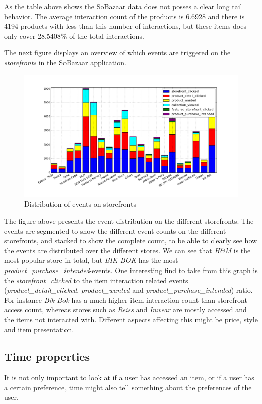     As the table above shows the SoBazaar data does not posses a clear long tail behavior.
    The average interaction count of the products is 6.6928 and there is 4194 products with less than this number of interactions, but these items does only cover 28.5408\% of the total interactions.

    The next figure displays an overview of which events are triggered on the \emph{storefronts} in the SoBazaar application.

    \begin{figure}[H]
        \includegraphics[width=5in]{image/storefront_nameandEventdistribution.png}
        \centering
        \caption{Distribution of events on storefronts}
    \label{figure:eventOnStoreFrontDist}
    \end{figure}
        The figure above presents the event distribution on the different storefronts.
        The events are segmented to show the different event counts on the different storefronts, and stacked to show the complete count, to be able to clearly see how the events are distributed over the different stores.
        We can see that \emph{H\&M} is the most popular store in total, but \emph{BIK BOK} has the most \emph{product\_purchase\_intended}-events.
        One interesting find to take from this graph is the \emph{storefront\_clicked} to the item interaction related events (\emph{product\_detail\_clicked}, \emph{product\_wanted} and \emph{product\_purchase\_intended}) ratio.
        For instance \emph{Bik Bok} has a much higher item interaction count than storefront access count, whereas stores such as \emph{Reiss} and \emph{Inwear} are mostly accessed and the items not interacted with.
        Different aspects affecting this might be price, style and item presentation.

\subsection{Time properties}
    It is not only important to look at if a user has accessed an item, or if a user has a certain preference, time might also tell something about the preferences of the user.

